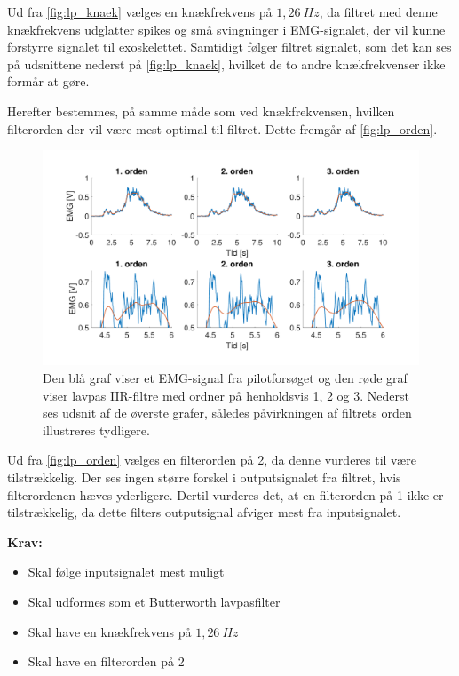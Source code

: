 \noindent
Ud fra \autoref{fig:lp_knaek} vælges en knækfrekvens på $1,26~Hz$, da filtret med denne knækfrekvens udglatter spikes og små svingninger i EMG-signalet, der vil kunne forstyrre signalet til exoskelettet. 
Samtidigt følger filtret signalet, som det kan ses på udsnittene nederst på \autoref{fig:lp_knaek}, hvilket de to andre knækfrekvenser ikke formår at gøre.

Herefter bestemmes, på samme måde som ved knækfrekvensen, hvilken filterorden der vil være mest optimal til filtret. Dette fremgår af \autoref{fig:lp_orden}.

\begin{figure} [H]
\centering
\includegraphics[width=1.0\textwidth]{figures/problemloesning/lavpas_orden.pdf}
\caption{Den blå graf viser et EMG-signal fra pilotforsøget og den røde graf viser lavpas IIR-filtre med ordner på henholdsvis 1, 2 og 3. Nederst ses udsnit af de øverste grafer, således påvirkningen af filtrets orden illustreres tydligere.}
\label{fig:lp_orden}
\end{figure} 

\noindent
Ud fra \autoref{fig:lp_orden} vælges en filterorden på 2, da denne vurderes til være tilstrækkelig. 
Der ses ingen større forskel i outputsignalet fra filtret, hvis filterordenen hæves yderligere. 
Dertil vurderes det, at en filterorden på 1 ikke er tilstrækkelig, da dette filters outputsignal afviger mest fra inputsignalet. 

\vspace{3mm}

\textbf{Krav:}
\begin{itemize}
\item Skal følge inputsignalet mest muligt  
\item Skal udformes som et Butterworth lavpasfilter
\item Skal have en knækfrekvens på $1,26~Hz$
\item Skal have en filterorden på 2
\end{itemize}


